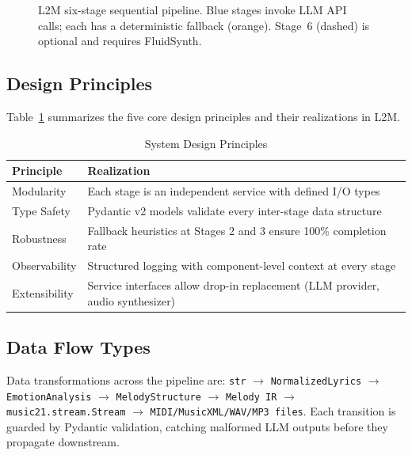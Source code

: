 \documentclass[conference]{IEEEtran}
\begin{document}
\begin{figure}[htbp]
{
}%
\caption{L2M six-stage sequential pipeline. Blue stages invoke LLM API
calls; each has a deterministic fallback (orange). Stage~6 (dashed) is
optional and requires FluidSynth.}
\label{fig:pipeline}
\end{figure}

\subsection{Design Principles}

Table~\ref{tab:design_principles} summarizes the five core design principles
and their realizations in L2M.

\begin{table}[htbp]
\caption{System Design Principles}
\label{tab:design_principles}
\centering
\begin{tabular}{@{}p{2.0cm}p{5.5cm}@{}}
\toprule
\textbf{Principle} & \textbf{Realization} \\
\midrule
Modularity      & Each stage is an independent service with defined I/O types \\
Type Safety     & Pydantic v2 models validate every inter-stage data structure \\
Robustness      & Fallback heuristics at Stages 2 and 3 ensure 100\% completion rate \\
Observability   & Structured logging with component-level context at every stage \\
Extensibility   & Service interfaces allow drop-in replacement (LLM provider, audio synthesizer) \\
\bottomrule
\end{tabular}
\end{table}

\subsection{Data Flow Types}

Data transformations across the pipeline are:
\texttt{str} $\to$ \texttt{NormalizedLyrics} $\to$ \texttt{EmotionAnalysis} $\to$
\texttt{MelodyStructure} $\to$ \texttt{Melody IR} $\to$ \texttt{music21.stream.Stream}
$\to$ \texttt{MIDI/MusicXML/WAV/MP3 files}.
Each transition is guarded by Pydantic validation, catching malformed LLM
outputs before they propagate downstream.
\end{document}
